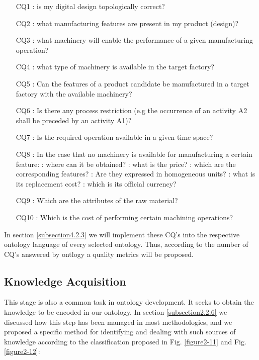 \begin{itemize}
	\item [CQ1]: is my digital design topologically correct?
	\item [CQ2]: what manufacturing features are present in my product (design)?
	\item [CQ3]: what machinery will enable the performance of a given manufacturing operation?
	\item [CQ4]: what type of machinery is available in the target factory?
	\item [CQ5]: Can the features of a product candidate be manufactured in a target factory with the available machinery?
	\item [CQ6]: Is there any process restriction (e.g the occurrence of an activity A2   shall be preceded by an activity A1)?
	\item [CQ7]: Is the required operation available in a given time space?
	\item [CQ8]: In the case that no machinery is available for manufacturing a certain feature:
	\subitem[CQ8.1]: where can it be obtained? 
	\subitem[CQ8.2]: what is the price?
	\subitem[CQ8.3]: which are the corresponding features?
	\subitem[CQ8.4]: Are they expressed in homogeneous units?
	\subitem[CQ8.5]: what is its replacement cost?
	\subitem[CQ8.6]: which is its official currency?  
	\item [CQ9]: Which are the attributes of the raw material?
	\item [CQ10]: Which is the cost of performing certain machining operations? 
	
\end{itemize}

\cbstart In section \ref{subsection4.2.3} we will implement these CQ's into the respective ontology language of every selected ontology. Thus, according to the number of CQ's answered by ontlogy a quality metrics will be proposed. \cbend


\subsection{Knowledge Acquisition}\label{4.1.3}

This stage is also a common task in ontology development. It seeks to obtain the knowledge to be encoded in our ontology. In section \ref{subsection2.2.6} we discussed how this step has been managed in most methodologies, and we proposed a specific method for identifying and dealing with such sources of knowledge according to the classification proposed in Fig. \ref{figure2-11} and Fig. \ref{figure2-12}:


